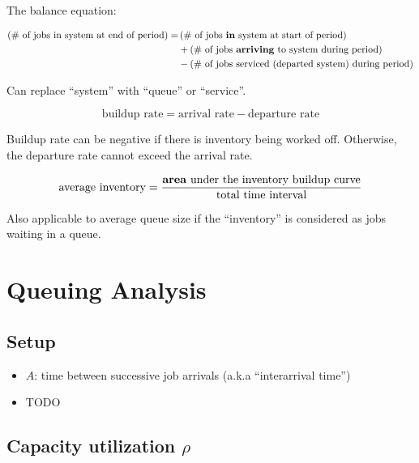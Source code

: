 \documentclass[11pt]{article}
\begin{document}
The balance equation:

\begin{equation}
    \begin{split}
    \left(\text{\# of jobs in system at end of period}\right) =& \left(\text{\# of jobs \textbf{in} system at start of period}\right) \\
    &+ \left(\text{\# of jobs \textbf{arriving} to system during period}\right) \\
    &- \left(\text{\# of jobs serviced (departed system) during period}\right)
    \end{split}
\end{equation}

Can replace ``system'' with ``queue'' or ``service''.

\begin{equation}
    \text{buildup rate} = \text{arrival rate} - \text{departure rate}
\end{equation}

Buildup rate can be negative if there is inventory being worked off. Otherwise, the departure rate cannot exceed the
arrival rate.

\begin{equation}
    \text{average inventory} = \frac{\text{\textbf{area} under the inventory buildup curve}}{\text{total time interval}}
\end{equation}

Also applicable to average queue size if the ``inventory'' is considered as jobs waiting in a queue.

\section{Queuing Analysis}

\subsection{Setup}

\begin{itemize}
    \item $A$: time between successive job arrivals (a.k.a ``interarrival time'')
    \item TODO
\end{itemize}

\subsection{Capacity utilization $\rho$}
\end{document}
